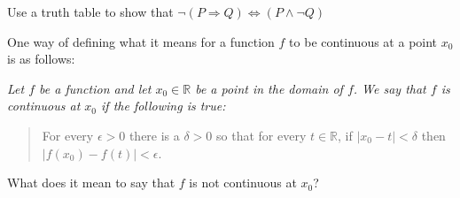 \begin{exercise}\label{exer:implication}
Use a truth table to show that $\neg(P\Rightarrow Q)\Leftrightarrow(P\land \neg Q)$
\end{exercise}

\begin{exercise}
One way of defining what it means for a function $f$ to be continuous at
a point $x_0$ is as follows:

\smallbreak\noindent
{\slshape Let $f$ be a function and let $x_0\in{\mathbb R}$ be a point in the domain of $f$. We say that $f$ is continuous at $x_0$ if the following is true:
\begin{quote}
For every $\epsilon>0$ there is a $\delta >0$ so that for every $t\in {\mathbb R}$, if $|x_0-t|<\delta$ then $|f(x_0)-f(t)|<\epsilon$. 
\end{quote}}
\smallbreak\noindent
What does it mean to say that $f$ is not continuous at $x_0$?
\end{exercise}

\clearpage
